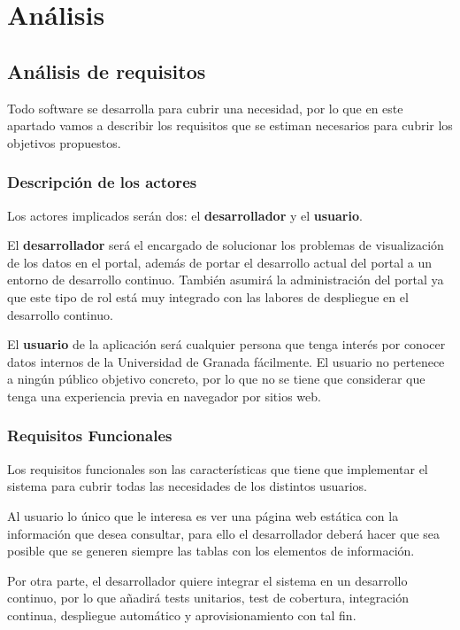 \chapter{Análisis}

\section{Análisis de requisitos}

Todo software se desarrolla para cubrir una necesidad, por lo que en este apartado vamos a describir los requisitos que se estiman necesarios para cubrir los objetivos propuestos.

\subsection{Descripción de los actores}

Los actores implicados serán dos: el \textbf{desarrollador} y el \textbf{usuario}.

\bigskip
El \textbf{desarrollador} será el encargado de solucionar los problemas de visualización de los datos en el portal, además de portar el desarrollo actual del portal a un entorno de desarrollo continuo. También asumirá la administración del portal ya que este tipo de rol está muy integrado con las labores de despliegue en el desarrollo continuo.

\bigskip
El \textbf{usuario} de la aplicación será cualquier persona que tenga interés por conocer datos internos de la Universidad de Granada fácilmente. El usuario no pertenece a ningún público objetivo concreto, por lo que no se tiene que considerar que tenga una experiencia previa en navegador por sitios web.

\subsection{Requisitos Funcionales}

Los requisitos funcionales son las características que tiene que implementar el sistema para cubrir todas las necesidades de los distintos usuarios.

\bigskip
Al usuario lo único que le interesa es ver una página web estática con la información que desea 
consultar, para ello el desarrollador deberá hacer que sea posible que se generen siempre las tablas con los elementos de información. 

\bigskip
Por otra parte, el desarrollador quiere integrar el sistema en un desarrollo continuo, por lo que añadirá tests unitarios, test de cobertura, integración continua, despliegue automático y aprovisionamiento con tal fin.

